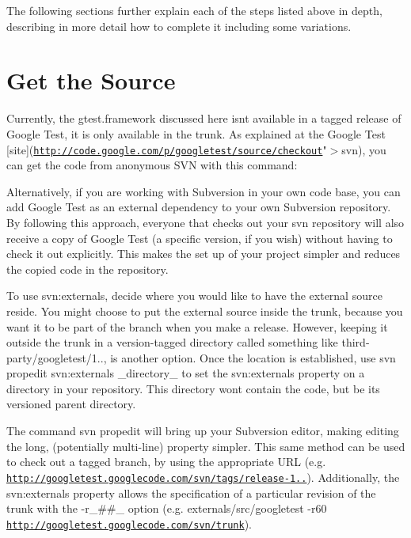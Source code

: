 The following sections further explain each of the steps listed above in depth, describing in more detail how to complete it including some variations.

\section*{Get the Source}

Currently, the gtest.\+framework discussed here isn\textquotesingle{}t available in a tagged release of Google Test, it is only available in the trunk. As explained at the Google Test \mbox{[}site\mbox{]}(\href{http://code.google.com/p/googletest/source/checkout}{\tt http\+://code.\+google.\+com/p/googletest/source/checkout}"$>$svn), you can get the code from anonymous S\+VN with this command\+:


\begin{DoxyCode}{0}
\end{DoxyCode}


Alternatively, if you are working with Subversion in your own code base, you can add Google Test as an external dependency to your own Subversion repository. By following this approach, everyone that checks out your svn repository will also receive a copy of Google Test (a specific version, if you wish) without having to check it out explicitly. This makes the set up of your project simpler and reduces the copied code in the repository.

To use {\ttfamily svn\+:externals}, decide where you would like to have the external source reside. You might choose to put the external source inside the trunk, because you want it to be part of the branch when you make a release. However, keeping it outside the trunk in a version-\/tagged directory called something like {\ttfamily third-\/party/googletest/1..}, is another option. Once the location is established, use {\ttfamily svn propedit svn\+:externals \+\_\+directory\+\_\+} to set the svn\+:externals property on a directory in your repository. This directory won\textquotesingle{}t contain the code, but be its versioned parent directory.

The command {\ttfamily svn propedit} will bring up your Subversion editor, making editing the long, (potentially multi-\/line) property simpler. This same method can be used to check out a tagged branch, by using the appropriate U\+RL (e.\+g. {\ttfamily \href{http://googletest.googlecode.com/svn/tags/release-1.0.1}{\tt http\+://googletest.\+googlecode.\+com/svn/tags/release-\/1..}}). Additionally, the svn\+:externals property allows the specification of a particular revision of the trunk with the {\ttfamily -\/r\+\_\+\#\#\+\_\+} option (e.\+g. {\ttfamily externals/src/googletest -\/r60 \href{http://googletest.googlecode.com/svn/trunk}{\tt http\+://googletest.\+googlecode.\+com/svn/trunk}}).

